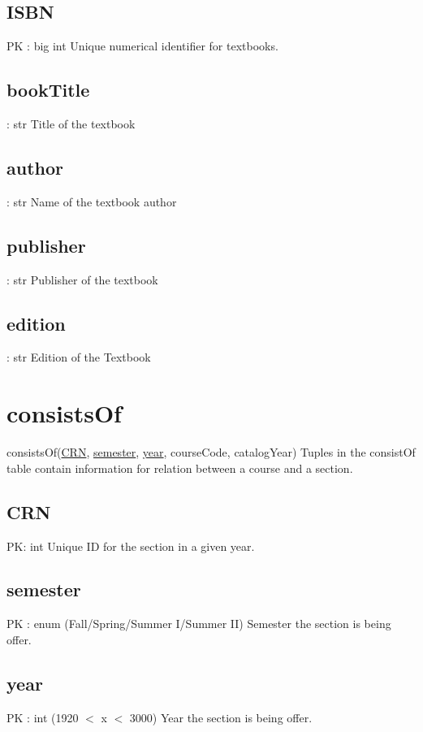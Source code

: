 	\subsection{ISBN}
		PK : big int
		Unique numerical identifier for textbooks.
	
	\subsection{bookTitle}
		: str 
		Title of the textbook
	
	\subsection{author}
		: str 
		Name of the textbook author
	
	\subsection{publisher}
		: str 
		Publisher of the textbook
	
	\subsection{edition}
		: str 
		Edition of the Textbook


\section{consistsOf}
	consistsOf(\underline{CRN}, \underline{semester}, \underline{year}, courseCode, catalogYear) 
		Tuples in the consistOf table contain information for relation between a course and a section.
	
	\subsection{CRN}
		PK: int 
		Unique ID for the section in a given year.

	\subsection{semester}
		PK : enum (Fall/Spring/Summer I/Summer II)
		Semester the section is being offer.
	
	\subsection{year}
		PK : int (1920 $<$ x $<$ 3000)
		Year the section is being offer.
	
